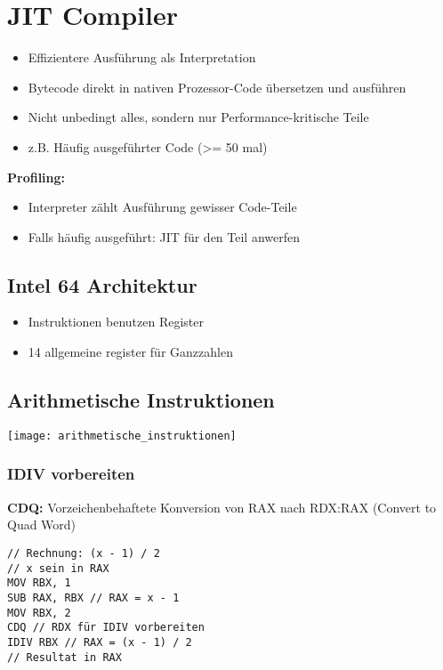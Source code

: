 
\section{JIT Compiler}
\begin{itemize}[topsep=0pt]
    \itemsep -0.2em
    \item Effizientere Ausführung als Interpretation
    \item Bytecode direkt in nativen Prozessor-Code übersetzen und ausführen
    \item Nicht unbedingt alles, sondern nur Performance-kritische Teile
    \item z.B. Häufig ausgeführter Code (>= 50 mal)
\end{itemize}

\textbf{Profiling:}
\begin{itemize}[topsep=0pt]
    \itemsep -0.2em
    \item Interpreter zählt Ausführung gewisser Code-Teile
    \item Falls häufig ausgeführt: JIT für den Teil anwerfen
\end{itemize}

\subsection{Intel 64 Architektur}
\begin{itemize}[topsep=0pt]
    \itemsep -0.2em
    \item Instruktionen benutzen Register
    \item 14 allgemeine register für Ganzzahlen
\end{itemize}

\subsection{Arithmetische Instruktionen}
\texttt{[image: arithmetische\_instruktionen]}

\subsubsection{IDIV vorbereiten}
\textbf{CDQ:} Vorzeichenbehaftete Konversion von RAX nach RDX:RAX (Convert to Quad Word)
\begin{lstlisting}
// Rechnung: (x - 1) / 2
// x sein in RAX
MOV RBX, 1
SUB RAX, RBX // RAX = x - 1
MOV RBX, 2
CDQ // RDX für IDIV vorbereiten
IDIV RBX // RAX = (x - 1) / 2
// Resultat in RAX
\end{lstlisting}

